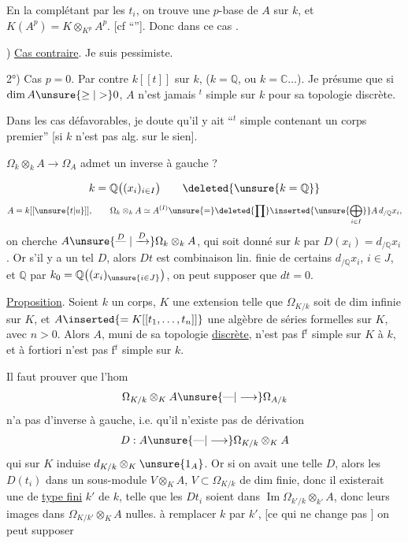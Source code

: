 En la complétant par les $t_i$, on trouve
une $p$-base de $A$ sur $k$, et $K(A^p)=K\otimes_{K^p}A^p$.
[cf ``'']. Donc dans ce cas .



) \uline{Cas contraire}. Je suis pessimiste.

2°) Cas $p=0$. Par contre $k[[t]]$ sur $k$,
($k=\mathbb Q$, ou $k=\mathbb C\ldots$). Je présume que
si $\dim A\unsure{\geq|>}0$, $A$ n'est jamais $^t$ simple
sur $k$ pour sa topologie discrète.

Dans les cas défavorables, je doute qu'il
y ait  ``$^t$ simple contenant un corps
premier'' [si $k$ n'est pas alg. sur le sien].

$\Omega_k\otimes_k A\longrightarrow\Omega_A$
admet un inverse à gauche ?

\[
k=\mathbb Q\bigl((x_i)_{i\in I}\bigr)
\qquad \deleted{\unsure{k=\mathbb Q}}
\]
\[
A=k[[\unsure{t|u}]],\qquad
\Omega_k\otimes_k A\simeq A^{(I)}
\unsure{=}\deleted{\prod}\inserted{\unsure{\bigoplus_{i\in I}}}
A\,d_{/\mathbb Q}x_i,
\]
on cherche $A\unsure{\mathrel{\overset{D}{\text{---}}}|\xrightarrow{D}}\Omega_k\otimes_k A$, qui soit
donné sur $k$ par $D(x_i)=d_{/\mathbb Q}x_i$.
Or s'il y a un tel $D$, alors $Dt$ est combinaison lin.
finie de certains $d_{/\mathbb Q}x_i$, $i\in J$, et 
$\mathbb Q$ par $k_0=\mathbb Q\bigl((x_i)_{\unsure{i\in J}}\bigr)$,
on peut supposer que
$dt=0$.



\uline{Proposition}. Soient $k$ un corps, $K$ une extension
telle que $\Omega_{K/k}$ soit de dim infinie sur
$K$, et $A\inserted{=K[[t_1,\ldots,t_n]]}$ une algèbre de séries formelles
sur $K$, avec $n>0$. Alors $A$, muni de sa
topologie \uline{discrète}, n'est pas f$^t$ simple sur $K$
 à $k$, et à fortiori n'est pas f$^t$ simple sur $k$.

Il faut prouver que l'hom
\[
\Omega_{K/k}\otimes_K A\unsure{\text{---}|\longrightarrow}\Omega_{A/k}
\]
n'a pas d'inverse à gauche, i.e. qu'il
n'existe pas de dérivation
\[
D:A\unsure{\text{---}|\longrightarrow}\Omega_{K/k}\otimes_K A
\]
qui sur $K$ induise $d_{K/k}\otimes_K\unsure{1_A}$. Or
si on avait une telle $D$, alors les
$D(t_i)$  dans un sous-module
$V\otimes_K A$, $V\subset\Omega_{K/k}$ de dim finie, donc
il existerait une  de \uline{type fini}
$k'$ de $k$, telle que les $Dt_i$ soient dans
$\operatorname{Im}\Omega_{k'/k}\otimes_{k'}A$, donc leurs images dans
$\Omega_{K/k'}\otimes_K A$  nulles. 
à remplacer $k$ par $k'$, [ce qui
ne change pas ] on peut supposer

